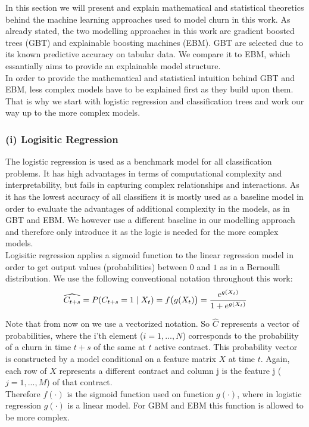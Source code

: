 \documentclass[12pt,titlepage]{article}
\begin{document}
In this section we will present and explain mathematical and statistical theoretics behind the machine learning approaches used to model churn in this work. As already stated, the two modelling approaches in this work are gradient boosted trees (GBT) and explainable boosting machines (EBM). GBT are selected due to its known predictive accuracy on tabular data. We compare it to EBM, which essantially aims to provide an explainable model structure. \\
In order to provide the mathematical and statistical intuition behind GBT and EBM, less complex models have to be explained first as they build upon them. That is why we start with logistic regression and classification trees and work our way up to the more complex models. \\

\subsubsection*{(i) Logisitic Regression}
The logistic regression is used as a benchmark model for all classification problems. It has high advantages in terms of computational complexity and interpretability, but fails in capturing complex relationships and interactions. As it has the lowest accuracy of all classifiers it is mostly used as a baseline model in order to evaluate the advantages of additional complexity in the models, as in GBT and EBM. We however use a different baseline in our modelling approach and therefore only introduce it as the logic is needed for the more complex models.\\
Logisitic regression applies a sigmoid function to the linear regression model in order to get output values (probabilities) between $0$ and $1$ as in a Bernoulli distribution. We use the following conventional notation throughout this work: \\

\begin{equation} \label{bern_dist}
    \widehat{C_{t+s}} = P(C_{t+s}=1\mid X_{t}) = f\big(g(X_{t})\big) = \frac{e^{g(X_{t})}}{1 + e^{g(X_{t})}} \\
\end{equation}

Note that from now on we use a vectorized notation. So $\hat{C}$ represents a vector of probabilities, where the i'th element ($i = 1,...,N$) corresponds to the probability of a churn in time $t+s$ of the same at $t$ active contract. This probability vector is constructed by a model conditional on a feature matrix $X$ at time $t$. Again, each row of $X$ represents a different contract and column j is the feature j ($j = 1,...,M$) of that contract. \\
Therefore $f(\cdot)$ is the sigmoid function used on function $g(\cdot)$, where in logistic regression $g(\cdot)$ is a linear model. For GBM and EBM this function is allowed to be more complex. \\
\end{document}
